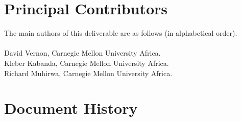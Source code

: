 \documentclass{CSSRforAfrica}
\newcommand{\blank}{~\\}
\begin{document}

\newpage



\pagebreak
\section*{Principal Contributors}
\label{contributors}
The main authors of this deliverable are as follows (in alphabetical order).
\blank
~
\blank
David Vernon, Carnegie Mellon University Africa.\\    %
Kleber Kabanda, Carnegie Mellon University Africa.\\    %
Richard Muhirwa, Carnegie Mellon University Africa.\\
                                                                    


\newpage
\section*{Document History}
\label{document_history}
\end{document}
